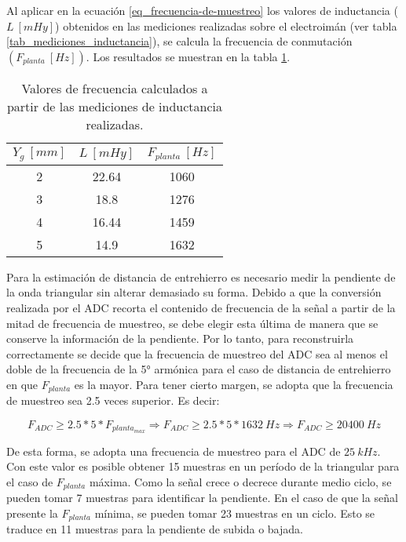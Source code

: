 Al aplicar en la ecuación \ref{eq_frecuencia-de-muestreo} los valores de inductancia ($L\:[mHy]$) obtenidos en las mediciones realizadas sobre el electroimán (ver tabla \ref{tab_mediciones_inductancia}), se calcula la frecuencia de conmutación  $(F_{planta}\:[Hz])$. Los resultados se muestran en la tabla \ref{frecuencias-calculadas}.



\begin{table}[H]
	\begin{center}
		\begin{tabular}{| c | c | c |}
			\hline
			$Y_g\:[mm]$ & $L\:[mHy]$ & $F_{planta}\:[Hz]$\\ \hline
			2 & 22.64 & 1060\\ \hline
			3 & 18.8 & 1276\\ \hline
			4 & 16.44 & 1459\\ \hline
			5 & 14.9 & 1632\\ \hline
		\end{tabular}
		\caption{Valores de frecuencia calculados a partir de las mediciones de inductancia realizadas.}
		\label{frecuencias-calculadas}
	\end{center}
\end{table}


 Para la estimación de distancia de entrehierro es necesario medir la pendiente de la onda triangular sin alterar demasiado su forma. Debido a que la conversión realizada por el ADC recorta el contenido de frecuencia de la señal a partir de la mitad de frecuencia de muestreo, se debe elegir esta última de manera que se conserve la información de la pendiente.  Por lo tanto, para reconstruirla correctamente se decide que la frecuencia de muestreo del ADC sea al menos el doble de la frecuencia de la 5° armónica para el caso de distancia de entrehierro en que $F_{planta}$ es la mayor. Para tener cierto margen, se adopta que la frecuencia de muestreo sea 2.5 veces superior. Es decir:

\begin{equation} 
	F_{ADC} \geq 2.5 * 5 * F_{planta_{max}} \Rightarrow  F_{ADC} \geq 2.5 * 5 * 1632\:Hz \Rightarrow F_{ADC} \geq 20400\:Hz
\end{equation}


 De esta forma, se adopta una frecuencia de muestreo para el ADC de  $25\:kHz$. Con este valor es posible obtener 15 muestras en un período de la triangular para el caso de $F_{planta}$ máxima. Como la señal crece o decrece durante medio ciclo, se pueden tomar 7 muestras para identificar la pendiente. En el caso de que la señal presente la $F_{planta}$ mínima, se pueden tomar 23 muestras en un ciclo. Esto se traduce en 11 muestras para la pendiente de subida o bajada. 


